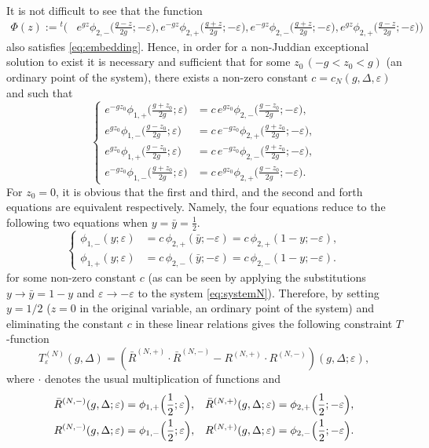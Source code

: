 \documentclass[11pt]{article}
\numberwithin{equation}{section}
\newcommand{\e}{\varepsilon}
\theoremstyle{plain}
\theoremstyle{definition}
\theoremstyle{remark}
\begin{document}
It is not difficult to see that the function
\begin{align*}
  \Phi(z):={}^t\Big(&e^{gz} \phi_{2,-}\big(\frac{g-z}{2g};-\e\big), e^{-gz} \phi_{2,+}\big(\frac{g+z}{2g};-\e\big),e^{-gz}\phi_{2,-}\big(\frac{g+z}{2g};-\e\big), e^{gz} \phi_{2,+}\big(\frac{g-z}{2g};-\e\big)\Big)
\end{align*}
also satisfies \eqref{eq:embedding}. Hence, in order for a non-Juddian exceptional solution to exist it is necessary and sufficient that
for some $z_0\, (-g<z_0<g)$ (an ordinary point of the system), there exists a non-zero constant $c=c_N(g,\Delta, \e)$ and such that
\begin{equation}\label{eq:4equations}
  \left\{
    \begin{aligned}
      e^{-gz_0}\phi_{1,+}\big(\frac{g+z_0}{2g};\e\big) &= c\, e^{gz_0}\phi_{2,-}\big(\frac{g-z_0}{2g};-\e\big),\\
      e^{gz_0} \phi_{1,-}\big(\frac{g-z_0}{2g};\e\big) &= c\, e^{-gz_0}\phi_{2,+}\big(\frac{g+z_0}{2g};-\e\big),\\
      e^{gz_0} \phi_{1,+}\big(\frac{g-z_0}{2g};\e\big) &= c\, e^{-gz_0}\phi_{2,-}\big(\frac{g+z_0}{2g};-\e\big),\\
      e^{-gz_0} \phi_{1,-}\big(\frac{g+z_0}{2g};\e\big) &= c\, e^{gz_0}\phi_{2,+}\big(\frac{g-z_0}{2g};-\e\big).
    \end{aligned} \right.
\end{equation}
For $z_0=0$, it is obvious that the first and third, and the second and forth equations are equivalent respectively. Namely, the four
equations reduce to the following two equations when $y=\bar{y}=\frac12$.
\begin{equation}\label{eq:constraint}
  \left\{
  \begin{aligned}
    \phi_{1,-}(y;\e) & = c\, \phi_{2,+}(\bar{y};-\e) =  c\, \phi_{2,+}(1-y;-\e),\\
    \phi_{1,+}(y;\e) & = c\, \phi_{2,-}(\bar{y};-\e)=c\, \phi_{2,-}(1-y;-\e).
  \end{aligned} \right.
\end{equation}
for some non-zero constant \(c\) (as can be seen by applying the substitutions \(y \to \bar{y}=1-y\) and \(\e \to -\e \)
to the system \eqref{eq:systemN}). Therefore, by setting \(y = 1/2 \) (\(z = 0 \) in the original variable, an ordinary point of the system)
and eliminating the constant \(c\) in these linear relations gives the following  constraint \( T\)-function
\begin{equation} \label{eq:exceptGfuncDef}
  T_\e^{(N)}(g,\Delta) = \left(\bar{R}^{(N,+)} \cdot \bar{R}^{(N,-)} - R^{(N,+)} \cdot R^{(N,-)} \right)(g,\Delta;\e),
\end{equation}
where \(\cdot\) denotes the usual multiplication of functions and 
\begin{align}
  \label{eq:gfuncR_Nminus}
  \bar{R}^{(N,-)}(g,\Delta;\e) &= \phi_{1,+}\Bigl(\frac12;\e\Bigr),   &\bar{R}^{(N,+)}(g,\Delta;\e) &=\phi_{2,+}\Bigl(\frac12;-\e\Bigr),  \\
  R^{(N,-)}(g,\Delta;\e) &=  \phi_{1,-}\Bigl(\frac12;\e\Bigr),  &R^{(N,+)}(g,\Delta;\e)  &= \phi_{2,-}\Bigl(\frac12;-\e\Bigr).
\end{align}
\end{document}
